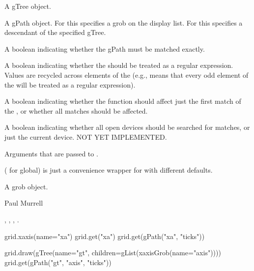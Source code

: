 \begin{Arguments}
\begin{ldescription}
\item[\code{gTree}] A gTree object.
\item[\code{gPath}]  A gPath object. For  this
specifies a grob on the display list.  For  this
specifies a descendant of the specified gTree. 
\item[\code{strict}]  A boolean indicating whether the gPath must be
matched exactly. 
\item[\code{grep}] A boolean indicating whether the  should
be treated as a regular expression.  Values are recycled across
elements of the  (e.g.,  means
that every odd element of the  will be treated as
a regular expression).

\item[\code{global}]  A boolean indicating whether the function should affect
just the first match of the , or whether all matches
should be affected.

\item[\code{allDevices}]  A boolean indicating whether all open devices
should
be searched for matches, or just the current device.
NOT YET IMPLEMENTED.

\item[\code{...}]  Arguments that are passed to . 
\end{ldescription}
\end{Arguments}
%
\begin{Details}\relax
{} ( for global) is just a convenience wrapper for
 with different defaults.
\end{Details}
%
\begin{Value}
A grob object.
\end{Value}
%
\begin{Author}\relax
Paul Murrell
\end{Author}
%
\begin{SeeAlso}\relax
{}, ,
, .
\end{SeeAlso}
%
\begin{Examples}
\begin{ExampleCode}
grid.xaxis(name="xa")
grid.get("xa")
grid.get(gPath("xa", "ticks"))

grid.draw(gTree(name="gt", children=gList(xaxisGrob(name="axis"))))
grid.get(gPath("gt", "axis", "ticks"))
\end{ExampleCode}
\end{Examples}
